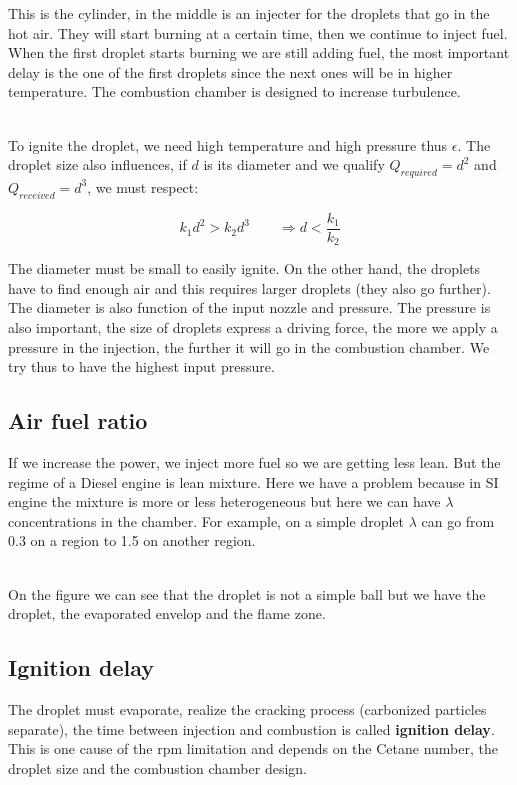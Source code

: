 	This is the cylinder, in the middle is an injecter for the droplets that go in the hot air. They will start burning at a certain time, then we continue to inject fuel. When the first droplet starts burning we are still adding fuel, the most important delay is the one of the first droplets since the next ones will be in higher temperature. The combustion chamber is designed to increase turbulence. 
	
	\ \\
	To ignite the droplet, we need high temperature and high pressure thus $\epsilon$. The droplet size also influences, if $d$ is its diameter and we qualify $Q_{required} = d^2$ and $Q_{received}=d^3$, we must respect: 
	
	\begin{equation}
	k_1 d^2 > k_2 d^3 \qquad \Rightarrow d < \frac{k_1}{k_2}
	\end{equation}

	The diameter must be small to easily ignite. On the other hand, the droplets have to find enough air and this requires larger droplets (they also go further). The diameter is also function of the input nozzle and pressure. The pressure is also important, the size of droplets express a driving force, the more we apply a pressure in the injection, the further it will go in the combustion chamber. We try thus to have the highest input pressure. 
	
\subsection{Air fuel ratio}
	If we increase the power, we inject more fuel so we are getting less lean. But the regime of a Diesel engine is lean mixture. Here we have a problem because in SI engine the mixture is more or less heterogeneous but here we can have $\lambda$ concentrations in the chamber. For example, on a simple droplet $\lambda$ can go from 0.3 on a region to 1.5 on another region. 
	
	\ \\ 
	On the figure we can see that the droplet is not a simple ball but we have the droplet, the evaporated envelop and the flame zone. 
	
\subsection{Ignition delay}
	The droplet must evaporate, realize the cracking process (carbonized particles separate), the time between injection and combustion is called \textbf{ignition delay}. This is one cause of the rpm limitation and depends on the Cetane number, the droplet size and the combustion chamber design. 
	
